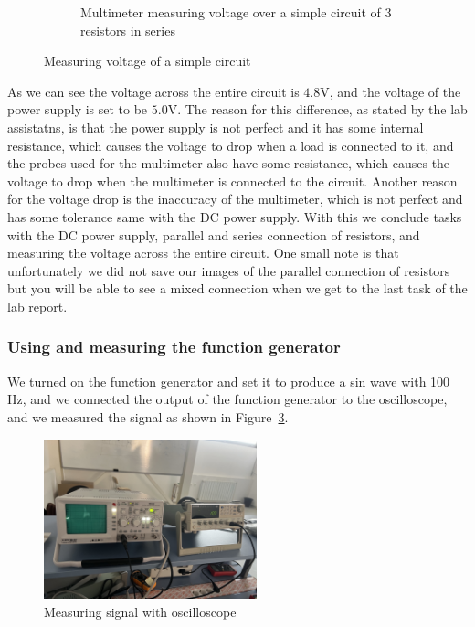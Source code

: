 \documentclass[a4paper, 10pt]{article}
\newcommand{\figref}[1]{Figure~\ref{#1}}
\begin{document}
\begin{figure}[h]
\begin{subfigure}[h]{0.65\textwidth}
								\caption{Multimeter measuring voltage over a simple circuit of 3 resistors in series}
								\label{sub-fig:MeasuringVoltageOfASimpleCircuit}
							\end{subfigure}

							\caption{Measuring voltage of a simple circuit}
							\label{fig:MeasuringVoltageOfACircuit}
					\end{figure}

					As we can see the voltage across the entire circuit is $4.8\text{V}$, and the voltage of the power supply is set to be $5.0\text{V}$. The reason for this difference, as stated by the
					lab assistatns, is that the power supply is not perfect and it has some internal resistance, which causes the voltage to drop when a load is connected to it, and the 
					probes used for the multimeter also have some resistance, which causes the voltage to drop when the multimeter is connected to the circuit. Another reason for the voltage drop is the
					inaccuracy of the multimeter, which is not perfect and has some tolerance same with the DC power supply. With this we conclude tasks with the DC power supply, parallel and series connection
					of resistors, and measuring the voltage across the entire circuit. One small note is that unfortunately we did not save our images of the parallel connection of resistors but you will be
					able to see a mixed connection when we get to the last task of the lab report.
				
				\subsubsection{Using and measuring the function generator}
					We turned on the function generator and set it to produce a sin wave with 100 Hz, and we connected the output of the function generator to the oscilloscope, and we measured the signal as shown in \figref{fig:MeasuringSignalWithOscilloscope}.
					\begin{figure}[h!]
						\centering
						\includegraphics[width=0.55\textwidth]{./images/MeasuringSignalWithOscilloscope.jpeg}
						\caption{Measuring signal with oscilloscope}
						\label{fig:MeasuringSignalWithOscilloscope}
					\end{figure}
\end{document}
